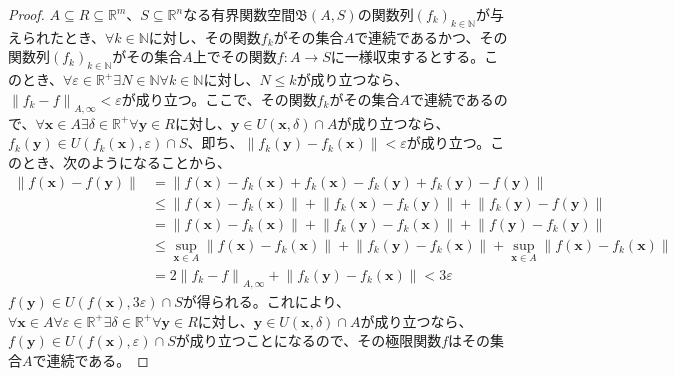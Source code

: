 \documentclass[dvipdfmx]{jsarticle}
\begin{document}
\begin{proof}
$A \subseteq R \subseteq \mathbb{R}^{m}$、$S \subseteq \mathbb{R}^{n}$なる有界関数空間$\mathfrak{B}(A,S)$の関数列$\left( f_{k} \right)_{k \in \mathbb{N}}$が与えられたとき、$\forall k \in \mathbb{N}$に対し、その関数$f_{k}$がその集合$A$で連続であるかつ、その関数列$\left( f_{k} \right)_{k \in \mathbb{N}}$がその集合$A$上でその関数$f:A \rightarrow S$に一様収束するとする。このとき、$\forall\varepsilon \in \mathbb{R}^{+}\exists N \in \mathbb{N}\forall k \in \mathbb{N}$に対し、$N \leq k$が成り立つなら、$\left\| f_{k} - f \right\|_{A,\infty} < \varepsilon$が成り立つ。ここで、その関数$f_{k}$がその集合$A$で連続であるので、$\forall\mathbf{x} \in A\exists\delta \in \mathbb{R}^{+}\forall\mathbf{y} \in R$に対し、$\mathbf{y} \in U\left( \mathbf{x},\delta \right) \cap A$が成り立つなら、$f_{k}\left( \mathbf{y} \right) \in U\left( f_{k}\left( \mathbf{x} \right),\varepsilon \right) \cap S$、即ち、$\left\| f_{k}\left( \mathbf{y} \right) - f_{k}\left( \mathbf{x} \right) \right\| < \varepsilon$が成り立つ。このとき、次のようになることから、
\begin{align*}
\left\| f\left( \mathbf{x} \right) - f\left( \mathbf{y} \right) \right\| &= \left\| f\left( \mathbf{x} \right) - f_{k}\left( \mathbf{x} \right) + f_{k}\left( \mathbf{x} \right) - f_{k}\left( \mathbf{y} \right) + f_{k}\left( \mathbf{y} \right) - f\left( \mathbf{y} \right) \right\|\\
&\leq \left\| f\left( \mathbf{x} \right) - f_{k}\left( \mathbf{x} \right) \right\| + \left\| f_{k}\left( \mathbf{x} \right) - f_{k}\left( \mathbf{y} \right) \right\| + \left\| f_{k}\left( \mathbf{y} \right) - f\left( \mathbf{y} \right) \right\|\\
&= \left\| f\left( \mathbf{x} \right) - f_{k}\left( \mathbf{x} \right) \right\| + \left\| f_{k}\left( \mathbf{y} \right) - f_{k}\left( \mathbf{x} \right) \right\| + \left\| f\left( \mathbf{y} \right) - f_{k}\left( \mathbf{y} \right) \right\|\\
&\leq \sup_{\mathbf{x} \in A}\left\| f\left( \mathbf{x} \right) - f_{k}\left( \mathbf{x} \right) \right\| + \left\| f_{k}\left( \mathbf{y} \right) - f_{k}\left( \mathbf{x} \right) \right\| + \sup_{\mathbf{x} \in A}\left\| f\left( \mathbf{x} \right) - f_{k}\left( \mathbf{x} \right) \right\|\\
&= 2\left\| f_{k} - f \right\|_{A,\infty} + \left\| f_{k}\left( \mathbf{y} \right) - f_{k}\left( \mathbf{x} \right) \right\| < 3\varepsilon
\end{align*}
$f\left( \mathbf{y} \right) \in U\left( f\left( \mathbf{x} \right),3\varepsilon \right) \cap S$が得られる。これにより、$\forall\mathbf{x} \in A\forall\varepsilon \in \mathbb{R}^{+}\exists\delta \in \mathbb{R}^{+}\forall\mathbf{y} \in R$に対し、$\mathbf{y} \in U\left( \mathbf{x},\delta \right) \cap A$が成り立つなら、$f\left( \mathbf{y} \right) \in U\left( f\left( \mathbf{x} \right),\varepsilon \right) \cap S$が成り立つことになるので、その極限関数$f$はその集合$A$で連続である。
\end{proof}
\end{document}
